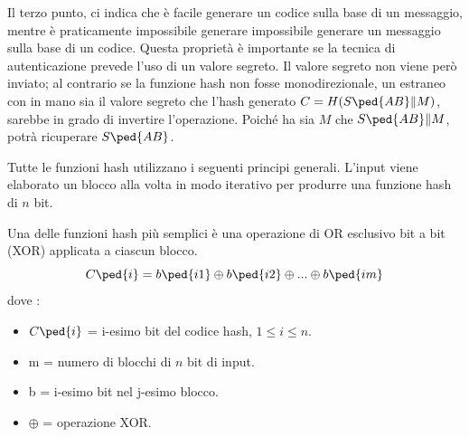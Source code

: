 Il terzo punto, ci indica che è facile generare un codice sulla base di un messaggio, mentre è praticamente impossibile generare impossibile generare un messaggio sulla base di un codice. Questa proprietà è importante se la tecnica di autenticazione prevede l'uso di un valore segreto. Il valore segreto non viene però inviato; al contrario se la funzione hash non fosse monodirezionale, un estraneo con in mano sia il valore segreto che l'hash generato \(C = H(S\ped{AB} \| M)\), sarebbe in grado di invertire l'operazione. Poiché ha sia \(M\) che \(S\ped{AB} \| M\), potrà ricuperare \(S\ped{AB}\).

Tutte le funzioni hash utilizzano i seguenti principi generali. L'input viene elaborato un blocco alla volta in modo iterativo per produrre una funzione hash di \(n\) bit.

Una delle funzioni hash più semplici è una operazione di OR esclusivo bit a bit (XOR) applicata a ciascun blocco.
\[ C\ped{i} = b\ped{i1} \oplus b\ped{i2} \oplus ... \oplus b\ped{im}\]
\newpage
dove : 

\begin{itemize}
    \item \(C\ped{i}\) = i-esimo bit del codice hash, \(1 \leq i \leq n\).
    \item m = numero di blocchi di \(n\) bit di input.
    \item b = i-esimo bit nel j-esimo blocco.
    \item \(\oplus\) = operazione XOR.
\end{itemize}

